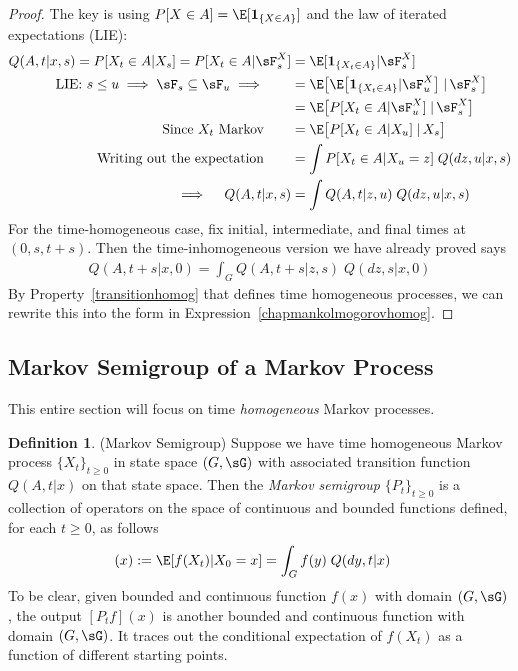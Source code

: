 \documentclass[12pt]{article}
\theoremstyle{plain}
\theoremstyle{definition}
\newtheorem{defn}[thm]{Definition}
\theoremstyle{remark}
\begin{document}
\begin{proof}
The key is using $P[X\in A]=\E[\mathbf{1}_{\{X\in A\}}]$ and the law of
iterated expectations (LIE):
\begin{align*}
  Q(A,t|x,s)
  =
  P[X_t\in A|X_s]
  =
  P[X_t\in A|\sF_s^X]
  &=
  \E[\mathbf{1}_{\{X_t\in A\}}|\sF_s^X]
  \\
  \text{LIE: $s\leq u\implies\sF_s\subseteq\sF_u\implies$}
  \qquad
  &=
  \E\big[
    \E\big[
    \mathbf{1}_{\{X_t\in A\}}|\sF_u^X
    \big]
    \;|\,\sF_s^X
  \big]
  \\
  &=
  \E\big[
    P[X_t\in A|\sF_u^X]
    \;|\,\sF_s^X
  \big]
  \\
  \text{Since $X_t$ Markov}
  \qquad
  &=
  \E\big[
    P[X_t\in A|X_u]
    \;|\,X_s
  \big]
  \\
  \text{Writing out the expectation}
  \qquad
  &=
  \int
  P[X_t\in A|X_u=z]
  \;Q(dz,u|x,s)
  \\
  \implies\quad
  Q(A,t|x,s)
  &=
  \int
  Q(A,t|z,u)
  \;Q(dz,u|x,s)
\end{align*}
For the time-homogeneous case, fix initial, intermediate, and
final times at $(0,s,t+s)$. Then the time-inhomogeneous version we have
already proved says
\begin{align*}
  Q(A,t+s|x,0)
  =
  \int_{G}
  Q(A,t+s|z,s)
  \;
  Q(dz,s|x,0)
\end{align*}
By Property~\ref{transitionhomog} that defines time homogeneous
processes, we can rewrite this into the form in
Expression~\ref{chapmankolmogorovhomog}.
\end{proof}

\clearpage
\subsection{Markov Semigroup of a Markov Process}

This entire section will focus on time \emph{homogeneous} Markov
processes.

\begin{defn}(Markov Semigroup)
Suppose we have time homogeneous Markov process $\{X_t\}_{t\geq 0}$ in
state space $(G,\sG)$ with associated transition function $Q(A,t|x)$ on
that state space. Then the \emph{Markov semigroup} $\{P_t\}_{t\geq 0}$
is a collection of operators on the space of continuous and bounded
functions
defined, for each $t\geq 0$, as follows
\begin{align*}
  [P_tf](x)
  &:=
  \E[f(X_t)|X_0=x]
  =
  \int_G
  f(y)
  \;Q(dy,t|x)
\end{align*}
To be clear, given bounded and continuous function $f(x)$ with domain
$(G,\sG)$, the output $[P_tf](x)$ is another bounded and continuous
function with domain $(G,\sG)$.
It traces out the conditional expectation of $f(X_t)$ as a function of
different starting points.
\end{defn}
\end{document}
